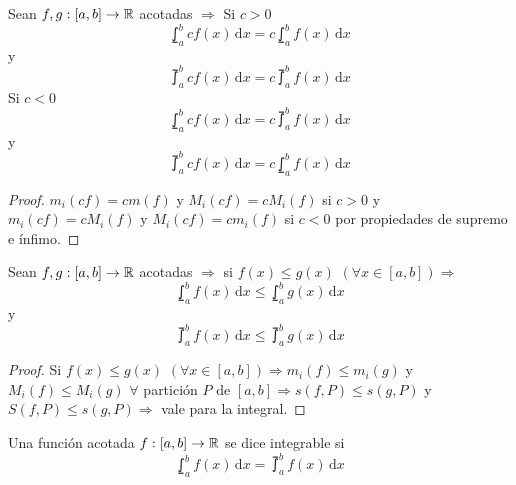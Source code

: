 \begin{prop}
  Sean $f, g: [a, b] \to \mathbb{R}$ acotadas $\Rightarrow$
  Si $c > 0$ \begin{equation}
    \lowint_a^b c f(x)\,\mathrm{d}x = c \lowint_a^b f(x)\,\mathrm{d}x
  \end{equation} y \begin{equation}
    \upint_a^b c f(x)\, \mathrm{d}x = c \upint_a^b f(x)\, \mathrm{d}x
  \end{equation}
  Si $c < 0$ \begin{equation}
    \lowint_a^b c f(x)\,\mathrm{d}x = c \upint_a^b f(x)\,\mathrm{d}x
  \end{equation} y \begin{equation}
    \upint_a^b c f(x)\,\mathrm{d}x = c \lowint_a^b f(x)\,\mathrm{d}x
  \end{equation}
  \begin{proof}
    $m_i(c f) = c m(f)$ y $M_i(c f) = c M_i(f)$ si $c > 0$ y $m_i(c f) = c M_i(f)$ y $M_i(c f) = c m_i(f)$ si $c < 0$ por propiedades de supremo e ínfimo.
  \end{proof}
\end{prop}

\begin{prop}
  Sean $f, g: [a, b] \to \mathbb{R}$ acotadas $\Rightarrow$ si $f(x) \leq g(x)$ $(\forall x \in [a, b]) \Rightarrow$ \begin{equation}
    \lowint_a^b f(x)\,\mathrm{d}x \leq \lowint_a^b g(x)\,\mathrm{d}x
  \end{equation} y \begin{equation}
    \upint_a^b f(x)\, \mathrm{d}x \leq \upint_a^b g(x)\, \mathrm{d}x
  \end{equation}
  \begin{proof}
    Si $f(x) \leq g(x)$ $(\forall x \in [a, b]) \Rightarrow m_i(f) \leq m_i(g)$ y $M_i(f) \leq M_i(g)$ $\forall$ partición $P$ de $[a, b] \Rightarrow s(f, P) \leq s(g, P)$ y $S(f, P) \leq s(g, P) \Rightarrow$ vale para la integral.
  \end{proof}
\end{prop}

\begin{definition}[Integrable]
  Una función acotada $f: [a, b] \to \mathbb{R}$ se dice integrable si \begin{equation}
    \lowint_a^b f(x) \, \mathrm{d}x = \upint_a^b f(x) \, \mathrm{d}x
  \end{equation}
\end{definition}

